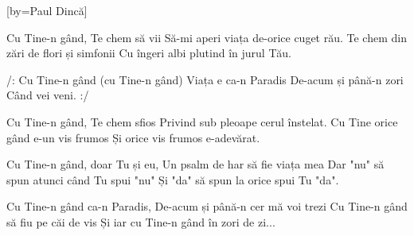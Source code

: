 
[by={Paul Dincă}]

\beginverse
Cu Tine-n gând, Te chem să vii
Să-mi aperi viața de-orice cuget rău.
Te chem din zări de flori și simfonii
Cu îngeri albi plutind în jurul Tău.
\endverse

\beginchorus
/: Cu Tine-n gând (cu Tine-n gând)
Viața e ca-n Paradis
De-acum și până-n zori
Când vei veni. :/
\endchorus

\beginverse
Cu Tine-n gând, Te chem sfios
Privind sub pleoape cerul înstelat.
Cu Tine orice gând e-un vis frumos
Și orice vis frumos e-adevărat.
\endverse

\beginverse
Cu Tine-n gând, doar Tu și eu,
Un psalm de har să fie viața mea
Dar "nu" să spun atunci când Tu spui "nu"
Și "da" să spun la orice spui Tu "da".
\endverse

\beginverse
Cu Tine-n gând ca-n Paradis,
De-acum și până-n cer mă voi trezi
Cu Tine-n gând să fiu pe căi de vis
Și iar cu Tine-n gând în zori de zi...
\endverse

\endsong
